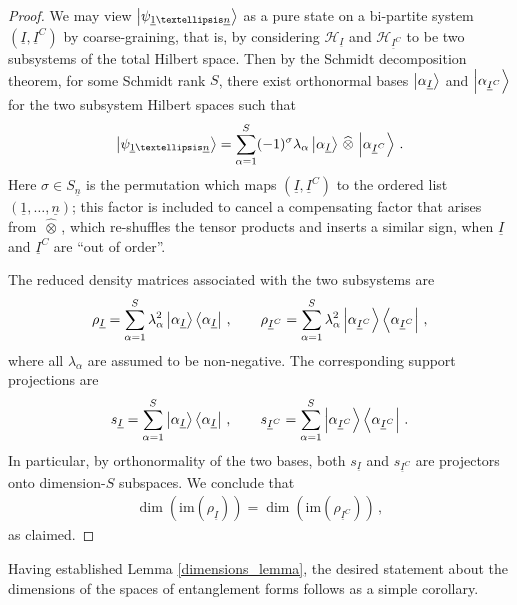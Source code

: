 \documentclass[12pt]{article}
\newcommand{\ul}[1]{{\underline{#1}}}
\newcommand{\im}{\mathrm{im}}
\newcommand{\wotimes}{ \, \widehat{\otimes} \, }
\numberwithin{equation}{section}
\newcommand{\psioneton}{{\psi_{\ul{1} \ldots \ul{n}}}}
\begin{document}
\begin{proof}
    We may view $\ket{\psioneton}$ as a pure state on a bi-partite system $\left( \ul{I} , \ul{I}^C \right)$ by coarse-graining, that is, by considering $\mathcal{H}_{\ul{I}}$ and $\mathcal{H}_{\ul{I}^C}$ to be two subsystems of the total Hilbert space. Then by the Schmidt decomposition theorem, for some Schmidt rank $S$, there exist orthonormal bases $\ket{ \alpha_{\ul{I}} }$ and $\ket{ \alpha_{\ul{I}^C} }$ for the two subsystem Hilbert spaces such that
    \begin{align}
        \ket{ \psioneton } = \sum_{\alpha = 1}^{S} ( - 1 )^\sigma \lambda_\alpha \ket{ \alpha_{\ul{I}} } \wotimes \ket{ \alpha_{\ul{I}^C} } \, .
    \end{align}
    Here $\sigma \in S_{\ul{n}}$ is the permutation which maps $(\ul{I} , \ul{I}^C)$ to the ordered list $(\ul{1} , \ldots, \ul{n})$; this factor is included to cancel a compensating factor that arises from $\wotimes$, which re-shuffles the tensor products and inserts a similar sign, when $\ul{I}$ and $\ul{I}^C$ are ``out of order''.

    The reduced density matrices associated with the two subsystems are
    \begin{align}
        \rho_{\ul{I}} = \sum_{\alpha = 1}^{S} \lambda_\alpha^2 \ket{\alpha_{\ul{I}}} \bra{\alpha_{\ul{I}}} \, , \qquad \rho_{\ul{I}^C} = \sum_{\alpha = 1}^{S} \lambda_\alpha^2 \ket{\alpha_{\ul{I}^C}} \bra{\alpha_{\ul{I}^C}} \, ,
    \end{align}
    where all $\lambda_\alpha$ are assumed to be non-negative. The corresponding support projections are
    \begin{align}
        s_{\ul{I}} = \sum_{\alpha = 1}^{S} \ket{\alpha_{\ul{I}}} \bra{\alpha_{\ul{I}}} \, , \qquad s_{\ul{I}^C} = \sum_{\alpha = 1}^{S} \ket{\alpha_{\ul{I}^C}} \bra{\alpha_{\ul{I}^C}} \, .
    \end{align}
    In particular, by orthonormality of the two bases, both $s_{\ul{I}}$ and $s_{\ul{I}^C}$ are projectors onto dimension-$S$ subspaces. We conclude that
    \begin{align}
        \dim \left( \im \left( \rho_{\ul{I}} \right) \right) = \dim \left( \im \left( \rho_{\ul{I}^C} \right) \right) \, ,
    \end{align}
    as claimed.
\end{proof}

Having established Lemma \ref{dimensions_lemma}, the desired statement about the dimensions of the spaces of entanglement forms follows as a simple corollary.
\end{document}
